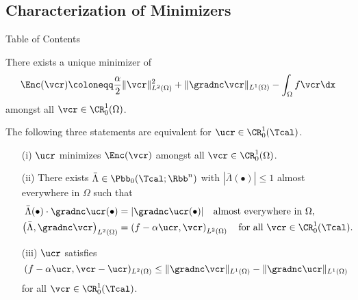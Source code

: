 \subsection{Characterization of Minimizers}
\begin{frame}{Table of Contents}
\end{frame}

\begin{frame}
  There exists a unique minimizer of 
  \begin{align*}
    \Enc(\vcr)\coloneqq \frac{\alpha}{2}\Vert \vcr\Vert_{L^2(\Omega)}^2
    +\Vert \gradnc\vcr\Vert_{L^1(\Omega)}
    -\int_\Omega f\vcr\dx
  \end{align*}
  amongst all $\vcr\in \CR^1_0(\Omega)$.

  \pause
  \bigskip

  The following three statements are equivalent for $\ucr\in\CR^1_0(\Tcal)$.
  \pause
  \begin{itemize}
    \item[(i)] $\ucr$ minimizes $\Enc(\vcr)$ amongst all $\vcr\in
      \CR^1_0(\Omega)$.
      \pause
    \item[(ii)] There exists
      $\bar\Lambda\in\Pbb_0(\Tcal;\Rbb^n)$ with $|\bar\Lambda(\bullet)|\leq 1$
      almost everywhere in $\Omega$ such that
      \begin{align*}
        \bar\Lambda(\bullet)\cdot\gradnc\ucr(\bullet)
        &=
        |\gradnc\ucr(\bullet)| \quad\text{almost everywhere in }
        \Omega, \\
        \left(\bar\Lambda,\gradnc\vcr\right)_{L^2(\Omega)}
        &= \left(f-\alpha\ucr,
        \vcr\right)_{L^2(\Omega)}
        \quad\text{for all } \vcr\in\CR^1_0(\Tcal).
      \end{align*}
      \pause
    \item[(iii)] $\ucr$ satisfies
      \begin{equation*}
        (f-\alpha\ucr,\vcr-\ucr)_{L^2(\Omega)}\leq
        \Vert\gradnc\vcr\Vert_{L^1(\Omega)} -
        \Vert\gradnc\ucr\Vert_{L^1(\Omega)}
      \end{equation*}
      for all $\vcr\in\CR^1_0(\Tcal)$.
  \end{itemize}
  
\end{frame}


